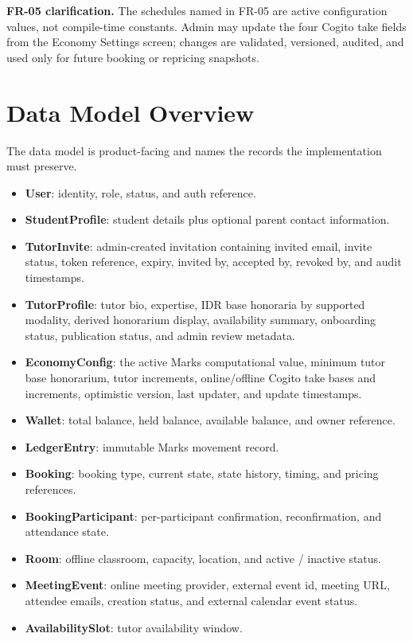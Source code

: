 \documentclass[11pt,a4paper]{article}
\begin{document}
\textbf{FR-05 clarification.} The schedules named in FR-05 are active configuration values, not compile-time constants. Admin may update the four Cogito take fields from the Economy Settings screen; changes are validated, versioned, audited, and used only for future booking or repricing snapshots.

\section{Data Model Overview}

The data model is product-facing and names the records the implementation must preserve.

\begin{itemize}
    \item \textbf{User}: identity, role, status, and auth reference.
    \item \textbf{StudentProfile}: student details plus optional parent contact information.
    \item \textbf{TutorInvite}: admin-created invitation containing invited email, invite status, token reference, expiry, invited by, accepted by, revoked by, and audit timestamps.
    \item \textbf{TutorProfile}: tutor bio, expertise, IDR base honoraria by supported modality, derived honorarium display, availability summary, onboarding status, publication status, and admin review metadata.
    \item \textbf{EconomyConfig}: the active Marks computational value, minimum tutor base honorarium, tutor increments, online/offline Cogito take bases and increments, optimistic version, last updater, and update timestamps.
    \item \textbf{Wallet}: total balance, held balance, available balance, and owner reference.
    \item \textbf{LedgerEntry}: immutable Marks movement record.
	\item \textbf{Booking}: booking type, current state, state history, timing, and pricing references.
	\item \textbf{BookingParticipant}: per-participant confirmation, reconfirmation, and attendance state.
	\item \textbf{Room}: offline classroom, capacity, location, and active / inactive status.
	\item \textbf{MeetingEvent}: online meeting provider, external event id, meeting URL, attendee emails, creation status, and external calendar event status.
	\item \textbf{AvailabilitySlot}: tutor availability window.

\end{itemize}
\end{document}
